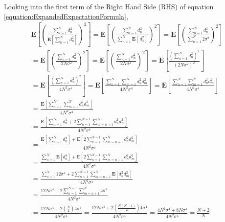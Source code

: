 \documentclass[a4paper,12pt]{article}
\begin{document}
Looking into the first term of the Right Hand Side (RHS) of equation \ref{equation:ExpandedExpectationFormula},
\begin{equation}
\label{equation:CurseOfDimLHS}
\begin{split}
\mathbf{E}\left[\left(\frac{\sum_{n=1}^{N} d_{n}^{2}}{\mathbf{E}[\sum_{n=1}^{N} d_{n}^{2}]}\right)^{2}\right]
= 
\mathbf{E}\left[\left(\frac{\sum_{n=1}^{N} d_{n}^{2}}{\sum_{n=1}^{N} \mathbf{E}[\ d_{n}^{2}]}\right)^{2}\right]
=
\mathbf{E}\left[\left(\frac{\sum_{n=1}^{N} d_{n}^{2}}{\sum_{n=1}^{N} 2\sigma^{2}}\right)^{2}\right] \\
=
\mathbf{E}\left[\left(\frac{\sum_{n=1}^{N} d_{n}^{2}}{2N\sigma^{2}}\right)^{2}\right]
= 
\mathbf{E}\left[\left(\frac{\sum_{n=1}^{N} d_{n}^{2}}{2N\sigma^{2}}\right)^{2}\right]
=
\mathbf{E}\left[\frac{(\sum_{n=1}^{N} d_{n}^{2})^{2}}{(2N\sigma^{2})^{2}}\right] \\
= 
\mathbf{E}\left[\frac{(\sum_{n=1}^{N} d_{n}^{2})^{2}}{4N^{2}\sigma^{4}}\right]
=
\mathbf{E}\left[\frac{\sum_{n=1}^{N}\sum_{m=1}^{N}d_{n}^{2}d_{m}^{2}}{4N^{2}\sigma^{4}}\right]
=
\mathbf{E}\left[\frac{\sum_{n=1}^{N}\sum_{m=1}^{N}d_{n}^{2}d_{m}^{2}}{4N^{2}\sigma^{4}}\right] \\
=
\frac{\mathbf{E}[\sum_{n=1}^{N}\sum_{m=1}^{N}d_{n}^{2}d_{m}^{2}]}{4N^{2}\sigma^{4}} \\
= 
\frac{\mathbf{E}[\sum_{n=1}^{N}d_{n}^{4} + 2\sum_{n=1}^{N-1}\sum_{m=n+1}^{N}d_{n}^{2}d_{m}^{2}]}{4N^{2}\sigma^{4}} \\
=
\frac{\mathbf{E}[\sum_{n=1}^{N}d_{n}^{4}] + \mathbf{E}[2\sum_{n=1}^{N-1}\sum_{m=n+1}^{N}d_{n}^{2}d_{m}^{2}]}{4N^{2}\sigma^{4}} \\
=
\frac{\sum_{n=1}^{N}\mathbf{E}[d_{n}^{4}] + \mathbf{E}[2\sum_{n=1}^{N-1}\sum_{m=n+1}^{N}d_{n}^{2}d_{m}^{2}]}{4N^{2}\sigma^{4}} \\
= 
\frac{\sum_{n=1}^{N}12\sigma^{4} + 2\sum_{n=1}^{N-1}\sum_{m=n+1}^{N}\mathbf{E}[d_{n}^{2}d_{m}^{2}]}{4N^{2}\sigma^{4}} \\
=
\frac{12N\sigma^{4} + 2\sum_{n=1}^{N-1}\sum_{m=n+1}^{N} 4\sigma^{4}}{4N^{2}\sigma^{4}} \\
=
\frac{12N\sigma^{4} + 2{N \choose 2}4\sigma^{4}}{4N^{2}\sigma^{4}} 
=
\frac{12N\sigma^{4} + 2(\frac{N(N-1)}{2}) 4\sigma^{4}}{4N^{2}\sigma^{4}} 
= \frac{4N^{2}\sigma^{4} + 8N\sigma^{4}}{4N^{2}\sigma^{4}} = \frac{N + 2}{N}
\end{split}
\end{equation} 
\end{document}
